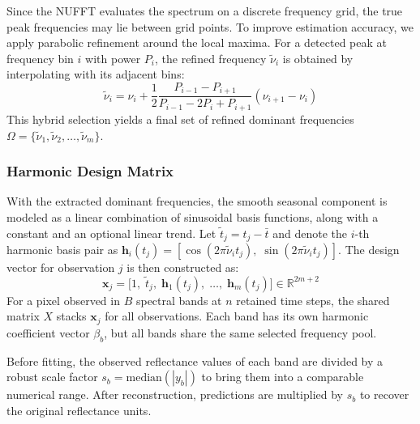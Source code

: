 \documentclass[letterpaper,journal]{IEEEtran}
\begin{document}
Since the NUFFT evaluates the spectrum on a discrete frequency grid, the true peak frequencies may lie between grid points. To improve estimation accuracy, we apply parabolic refinement around the local maxima. For a detected peak at frequency bin $i$ with power $P_i$, the refined frequency $\tilde{\nu}_i$ is obtained by interpolating with its adjacent bins:
\begin{equation}
\label{eq:parabolic}
\tilde{\nu}_i = \nu_i + \frac{1}{2}\frac{P_{i-1} - P_{i+1}}{P_{i-1} - 2P_i + P_{i+1}} (\nu_{i+1} - \nu_i)
\end{equation}
This hybrid selection yields a final set of refined dominant frequencies $\Omega = \{\tilde{\nu}_1, \tilde{\nu}_2, \dots, \tilde{\nu}_m\}$.

\subsubsection{Harmonic Design Matrix}
With the extracted dominant frequencies, the smooth seasonal component is modeled as a linear combination of sinusoidal basis functions, along with a constant and an optional linear trend. Let $\tilde{t}_j = t_j - \bar{t}$ and denote the $i$-th harmonic basis pair as $\mathbf{h}_i(t_j) = [\cos(2\pi\tilde{\nu}_i t_j), \;\sin(2\pi\tilde{\nu}_i t_j)]$. The design vector for observation $j$ is then constructed as:
\begin{equation}
\label{eq:design}
\mathbf{x}_j = \bigl[1,\; \tilde{t}_j,\; \mathbf{h}_1(t_j),\; \dots,\; \mathbf{h}_m(t_j)\bigr] \in \mathbb{R}^{2m+2}
\end{equation}
For a pixel observed in $B$ spectral bands at $n$ retained time steps, the shared matrix $X$ stacks $\mathbf{x}_j$ for all observations. Each band has its own harmonic coefficient vector $\beta_b$, but all bands share the same selected frequency pool.

Before fitting, the observed reflectance values of each band are divided by a robust scale factor $s_b = \text{median}(|y_b|)$ to bring them into a comparable numerical range. After reconstruction, predictions are multiplied by $s_b$ to recover the original reflectance units.
\end{document}
